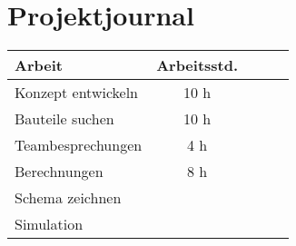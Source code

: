 \chapter{Projektjournal}


\begin{tabular}{|l|c|c|c|c|}
\hline
\textbf{Arbeit} & \textbf{Arbeitsstd.} \\
\hline\hline
Konzept entwickeln &  10 h\\
Bauteile suchen &10 h \\
Teambesprechungen & 4 h\\
Berechnungen & 8 h\\
Schema zeichnen &     \\
Simulation & \\
\hline
\end{tabular}